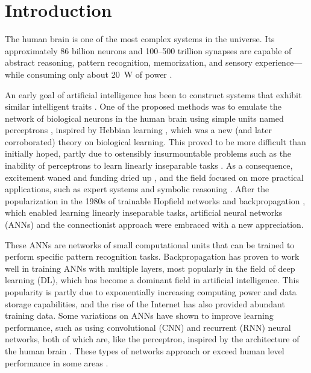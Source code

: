 \chapter{Introduction}\label{ch:introduction}

The human brain is one of the most complex systems in the universe.
Its approximately 86 billion neurons \citep{azevedo2009equal} and 100--500 trillion synapses \citep{drachman2005we} are capable of abstract reasoning, pattern recognition, memorization, and sensory experience---while consuming only about \SI{20}{\watt} of power \citep{sokoloff1960metabolism,drubach2000brain}.

An early goal of artificial intelligence has been to construct systems that exhibit similar intelligent traits \citep{turing2009computing}.
One of the proposed methods was to emulate the network of biological neurons in the human brain using simple units named perceptrons \citep{rosenblatt1958perceptron}, inspired by Hebbian learning \citep{hebb1949organization}, which was a new (and later corroborated) theory on biological learning.
This proved to be more difficult than initially hoped, partly due to ostensibly insurmountable problems such as the inability of perceptrons to learn linearly inseparable tasks \citep{minsky1969introduction}.
As a consequence, excitement waned and funding dried up \citep{crevier1993ai}, and the field focused on more practical applications, such as expert systems and symbolic reasoning \citep{haugeland1985artificial}.
After the popularization in the 1980s of trainable Hopfield networks \citep{hopfield1982neural} and backpropagation \citep{rumelhart1986learning}, which enabled learning linearly inseparable tasks, artificial neural networks (ANNs) and the connectionist approach were embraced with a new appreciation.

These ANNs are networks of small computational units that can be trained to perform specific pattern recognition tasks.
Backpropagation has proven to work well in training ANNs with multiple layers, most popularly in the field of deep learning (DL), which has become a dominant field in artificial intelligence.
This popularity is partly due to exponentially increasing computing power and data storage capabilities, and the rise of the Internet has also provided abundant training data.
Some variations on ANNs have shown to improve learning performance, such as using convolutional (CNN) and recurrent (RNN) neural networks, both of which are, like the perceptron, inspired by the architecture of the human brain \citep{fukushima1982neocognitron,lecun1995convolutional,lukovsevivcius2009reservoir}.
These types of networks approach or exceed human level performance in some areas \citep{schmidhuber2015deep}.

